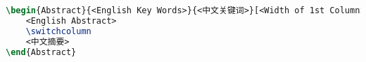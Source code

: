 \begin{lstlisting}[language=LaTeX, label=listing:abstract]
\begin{Abstract}{<English Key Words>}{<中文关键词>}[<Width of 1st Column>]
    <English Abstract>
    \switchcolumn
    <中文摘要>
\end{Abstract}
\end{lstlisting}
